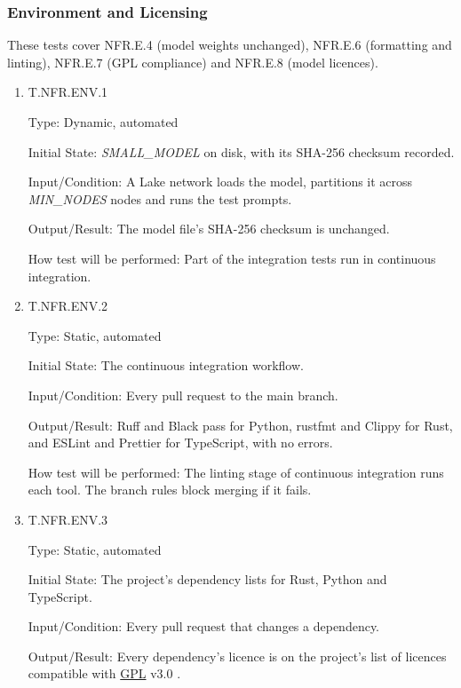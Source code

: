 \documentclass[12pt, titlepage]{article}
\providecommand{\glink}[2]{\hyperlink{gls:#1}{#2}}
\begin{document}
\subsubsection{Environment and Licensing}

These tests cover NFR.E.4 (model weights unchanged), NFR.E.6 (formatting and
linting), NFR.E.7 (GPL compliance) and NFR.E.8 (model licences).

\begin{enumerate}

\item{T.NFR.ENV.1\\}
\label{T.NFR.ENV.1}

Type: Dynamic, automated

Initial State: \textit{SMALL\_MODEL} on disk, with its SHA-256 checksum
recorded.

Input/Condition: A Lake network loads the model, partitions it across \textit{MIN\_NODES} nodes
and runs the test prompts.

Output/Result: The model file's SHA-256 checksum is unchanged.

How test will be performed: Part of the integration tests run in continuous
integration.

\item{T.NFR.ENV.2\\}
\label{T.NFR.ENV.2}

Type: Static, automated

Initial State: The continuous integration workflow.

Input/Condition: Every pull request to the main branch.

Output/Result: Ruff \citep{Ruff} and Black \citep{Black} pass for Python,
rustfmt \citep{Rustfmt} and Clippy \citep{Clippy} for Rust, and ESLint
\citep{ESLint} and Prettier \citep{Prettier} for TypeScript, with no errors.

How test will be performed: The linting stage of continuous integration runs
each tool. The branch rules block merging if it fails.

\item{T.NFR.ENV.3\\}
\label{T.NFR.ENV.3}

Type: Static, automated

Initial State: The project's dependency lists for Rust, Python and TypeScript.

Input/Condition: Every pull request that changes a dependency.

Output/Result: Every dependency's licence is on the project's list of
licences compatible with \glink{gpl}{GPL} v3.0 \citep{GPLv3}.


\end{enumerate}
\end{document}
